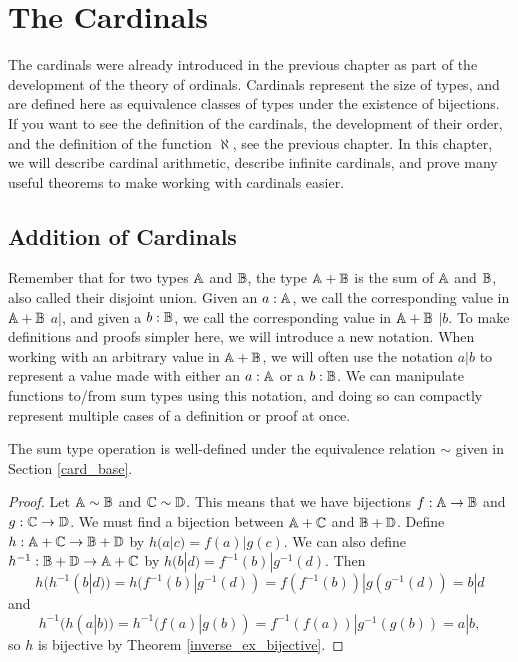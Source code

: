 \documentclass[../../math.tex]{subfiles}
\begin{document}
\setcounter{chapter}{9}

\chapter{The Cardinals}

The cardinals were already introduced in the previous chapter as part of the
development of the theory of ordinals.  Cardinals represent the size of types,
and are defined here as equivalence classes of types under the existence of
bijections.  If you want to see the definition of the cardinals, the
development of their order, and the definition of the function $\aleph$, see the
previous chapter.  In this chapter, we will describe cardinal arithmetic,
describe infinite cardinals, and prove many useful theorems to make working with
cardinals easier.

\section{Addition of Cardinals}

Remember that for two types $\mathbb{A}$ and $\mathbb{B}$, the type $\mathbb{A} + \mathbb{B}$ is the sum of $\mathbb{A}$
and $\mathbb{B}$, also called their disjoint union.  Given an $a : \mathbb{A}$, we call the
corresponding value in $\mathbb{A} + \mathbb{B}$ $a|$, and given a $b : \mathbb{B}$, we call the
corresponding value in $\mathbb{A} + \mathbb{B}$ $|b$.  To make definitions and proofs simpler
here, we will introduce a new notation.  When working with an arbitrary value in
$\mathbb{A} + \mathbb{B}$, we will often use the notation $a|b$ to represent a value made with
either an $a : \mathbb{A}$ or a $b : \mathbb{B}$.  We can manipulate functions to/from sum types
using this notation, and doing so can compactly represent multiple cases of a
definition or proof at once.

\begin{lemma}
    The sum type operation is well-defined under the equivalence relation $\sim$
    given in Section \ref{card_base}.
\end{lemma}
\begin{proof}
    Let $\mathbb{A} \sim \mathbb{B}$ and $\mathbb{C} \sim \mathbb{D}$.  This means that we have bijections $f :
    \mathbb{A} \to \mathbb{B}$ and $g : \mathbb{C} \to \mathbb{D}$.  We must find a bijection between $\mathbb{A} + \mathbb{C}$
    and $\mathbb{B} + \mathbb{D}$.  Define $h : \mathbb{A} + \mathbb{C} \to \mathbb{B} + \mathbb{D}$ by $h(a|c) = f(a)|g(c)$.
    We can also define $h^{-1} : \mathbb{B} + \mathbb{D} \to \mathbb{A} + \mathbb{C}$ by $h(b|d) =
    f^{-1}(b)|g^{-1}(d)$.  Then
    \[
        h(h^{-1}(b|d))
        = h(f^{-1}(b)|g^{-1}(d))
        = f(f^{-1}(b))|g(g^{-1}(d))
        = b|d
    \]
    and
    \[
        h^{-1}(h(a|b))
        = h^{-1}(f(a)|g(b))
        = f^{-1}(f(a))|g^{-1}(g(b)) =
        a|b,
    \]
    so $h$ is bijective by Theorem \ref{inverse_ex_bijective}.
\end{proof}
\end{document}
